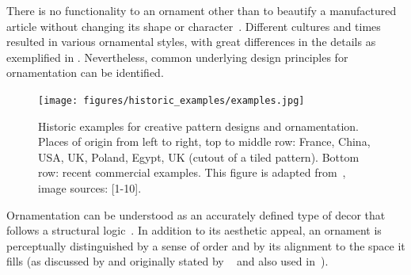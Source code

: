 There is no functionality to an ornament other than to beautify a manufactured article without changing its shape or character~\cite{ward_1896_tpo}.
Different cultures and times resulted in various ornamental styles, with great differences in the details as exemplified in . Nevertheless, common underlying design principles for ornamentation can be identified.

\begin{figure}
       \texttt{[image: figures/historic\_examples/examples.jpg]}
        \caption[Historic pattern examples]{\label{fig:historic_examples} Historic examples for creative pattern designs and ornamentation. Places of origin from left to right, top to middle row:  France, China, USA, UK, Poland, Egypt, UK (cutout of a tiled pattern). Bottom row: recent commercial examples. This figure is adapted from~\cite{gieseke_2017_ooo}, image sources: [1-10].}
\end{figure}

Ornamentation can be understood as an accurately defined type of decor that follows a structural logic~\cite{ward_1896_tpo, moughtin_1999_udo, arbruzzo_2006_dec}. 
In addition to its aesthetic appeal, an ornament is perceptually distinguished by a sense of order and by its alignment to the space it fills (as discussed by \cite{wong_1998_cgf,gieseke_2017_ooo} and originally stated by \citeauthor*{ward_1896_tpo}~\cite{ward_1896_tpo} and also used in~\cite{dresser_1875_pdd, arbruzzo_2006_dec}). 




